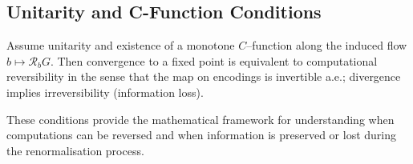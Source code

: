 \subsection{Unitarity and C-Function Conditions}

\begin{conjecture}[Reversibility vs. RG]
\label{conj:reversibility-rg}
Assume unitarity and existence of a monotone $C$–function along the induced flow $b\mapsto \mathcal{R}_b G$. Then convergence to a fixed point is equivalent to computational reversibility in the sense that the map on encodings is invertible a.e.; divergence implies irreversibility (information loss).
\end{conjecture}

These conditions provide the mathematical framework for understanding when computations can be reversed and when information is preserved or lost during the renormalisation process.
